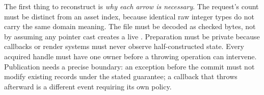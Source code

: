 
The first thing to reconstruct is \emph{why each arrow is necessary}. The request's count must be distinct from an asset index, because identical raw integer types do not carry the same domain meaning. The file must be decoded as checked bytes, not by assuming any pointer cast creates a live . Preparation must be private because callbacks or render systems must never observe half-constructed state. Every acquired handle must have one owner before a throwing operation can intervene. Publication needs a precise boundary: an exception before the commit must not modify existing records under the stated guarantee; a callback that throws afterward is a different event requiring its own policy.

